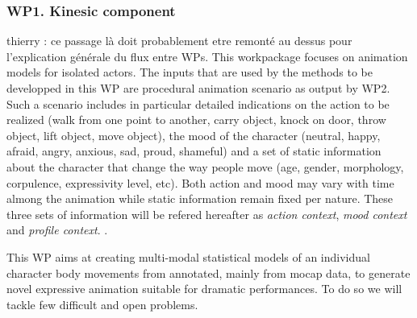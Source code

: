 
\subsubsection{WP1. Kinesic component} 

\begin{xcomment}  
thierry : ce passage là doit probablement etre remonté au dessus pour l'explication générale du flux entre WPs. This workpackage focuses on animation models for isolated actors. 
The inputs that are used by the methods to be developped in this WP are procedural animation scenario as output by WP2. 
Such a scenario includes in particular detailed indications on the action to be realized (walk from one point to another, carry object, knock on door, throw object, lift object, move object), the mood of the character (neutral, happy, afraid, angry, anxious, sad, proud, shameful) and a set of static information about the character that change the way people move (age, gender, morphology, corpulence, expressivity level, etc). Both action and mood may vary with time almong the animation while static information remain fixed per nature. 
These three sets of information will be refered hereafter as \textit{action context}, \textit{mood context} and \textit{profile context}. . 
\end{xcomment}



This WP aims at creating multi-modal statistical models of an individual character body movements from annotated, mainly from mocap data, to generate novel expressive animation suitable for dramatic performances. To do so we will tackle few difficult and open problems. 

